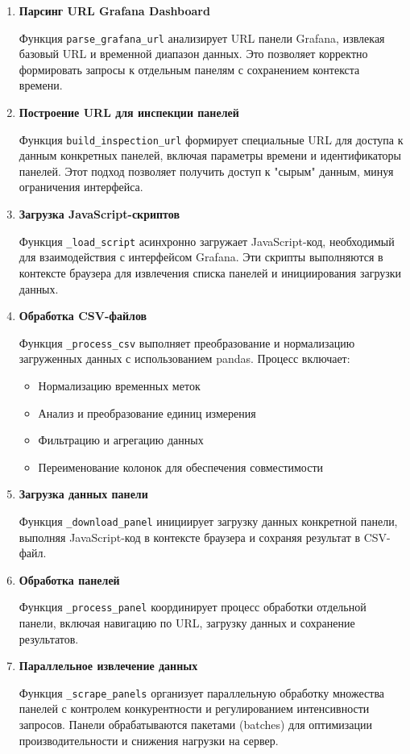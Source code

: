 \begin{enumerate}
	\item \textbf{Парсинг URL Grafana Dashboard}

	      Функция \texttt{parse\_grafana\_url} анализирует URL панели Grafana, извлекая
	      базовый URL и временной диапазон данных. Это позволяет корректно формировать
	      запросы к отдельным панелям с сохранением контекста времени.

	\item \textbf{Построение URL для инспекции панелей}

	      Функция \texttt{build\_inspection\_url} формирует специальные URL для доступа к
	      данным конкретных панелей, включая параметры времени и идентификаторы панелей.
	      Этот подход позволяет получить доступ к "сырым" данным, минуя ограничения
	      интерфейса.

	\item \textbf{Загрузка JavaScript-скриптов}

	      Функция \texttt{\_load\_script} асинхронно загружает JavaScript-код,
	      необходимый для взаимодействия с интерфейсом Grafana. Эти скрипты выполняются в
	      контексте браузера для извлечения списка панелей и инициирования загрузки
	      данных.

	\item \textbf{Обработка CSV-файлов}

	      Функция \texttt{\_process\_csv} выполняет преобразование и нормализацию
	      загруженных данных с использованием pandas. Процесс включает:
	      \begin{itemize}
		      \item Нормализацию временных меток
		      \item Анализ и преобразование единиц измерения
		      \item Фильтрацию и агрегацию данных
		      \item Переименование колонок для обеспечения совместимости
	      \end{itemize}

	\item \textbf{Загрузка данных панели}

	      Функция \texttt{\_download\_panel} инициирует загрузку данных конкретной
	      панели, выполняя JavaScript-код в контексте браузера и сохраняя результат в
	      CSV-файл.

	\item \textbf{Обработка панелей}

	      Функция \texttt{\_process\_panel} координирует процесс обработки отдельной
	      панели, включая навигацию по URL, загрузку данных и сохранение результатов.

	\item \textbf{Параллельное извлечение данных}

	      Функция \texttt{\_scrape\_panels} организует параллельную обработку множества
	      панелей с контролем конкурентности и регулированием интенсивности запросов.
	      Панели обрабатываются пакетами (batches) для оптимизации производительности и
	      снижения нагрузки на сервер.
\end{enumerate}

